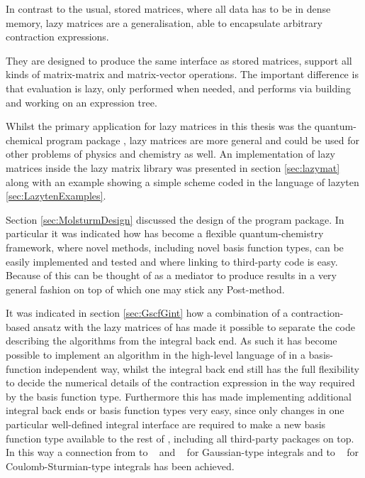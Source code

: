 
In contrast to the usual, stored matrices,
where all data has to be in dense memory,
lazy matrices are a generalisation,
able to encapsulate arbitrary contraction expressions.

They are designed to produce the same interface as stored matrices,
\ie support all kinds of matrix-matrix and matrix-vector operations.
The important difference is that
evaluation is lazy,
\ie only performed when needed,
and performs via building and working on an expression tree.



Whilst the primary application for lazy matrices in this thesis was the quantum-chemical
program package \molsturm,
lazy matrices are more general and could be used for other problems
of physics and chemistry as well.
An implementation of lazy matrices inside the
lazy matrix library \lazyten was presented in section \ref{sec:lazymat}
along with an example showing a simple \SCF
scheme coded in the language of lazyten \ref{sec:LazytenExamples}.


Section \ref{sec:MolsturmDesign} discussed
the design of the \molsturm program package.
In particular it was indicated how
\molsturm has become a flexible quantum-chemistry framework,
where novel methods,
including novel basis function types,
can be easily implemented and tested
and where linking to third-party code is easy.
Because of this \molsturm can be thought of as a mediator
to produce \SCF results in a very general fashion
on top of which one may stick any Post-\HF method.

It was indicated in section \ref{sec:GscfGint}
how a combination of a contraction-based \SCF ansatz
with the lazy matrices of \lazyten
has made it possible to separate the code describing
the \SCF algorithms from the integral back end.
As such it has become possible to implement
an \SCF algorithm in the high-level language of \lazyten
in a basis-function independent way,
whilst the integral back end still has the full flexibility
to decide the numerical details
of the contraction expression in the way required by the basis function type.
Furthermore this has made implementing
additional integral back ends or basis function types very easy,
since only changes in one particular well-defined integral
interface are required to make
a new basis function type available to the rest of \molsturm,
including all third-party packages on top.
In this way a connection from \molsturm
to \libint~\cite{Libint2_231,Libint2} and \libcint~\cite{Sun2015}
for Gaussian-type integrals
and to \sturmint~\cite{sturmintWeb}
for Coulomb-Sturmian-type integrals has been achieved.


